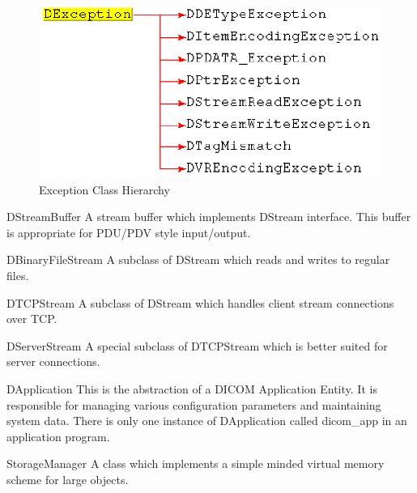 \documentclass[a4paper,10pt]{article}
\begin{document}
\begin{figure}[htbp]
  \begin{center}
    \includegraphics[scale=1.0]{exception-classhierarchy.eps}
    \caption{Exception Class Hierarchy}
    \label{fig:exception}
  \end{center}
\end{figure}


\begin{class}{DStreamBuffer}
  A stream buffer which implements DStream interface. This
  buffer is appropriate for PDU/PDV style input/output.
\end{class}

\begin{class}{DBinaryFileStream}
  A subclass of DStream which reads and writes to regular
  files.
\end{class}

\begin{class}{DTCPStream}
  A subclass of DStream which handles client stream connections
  over TCP.
\end{class}

\begin{class}{DServerStream}
  A special subclass of DTCPStream which is better suited for
  server connections.
\end{class}

\begin{class}{DApplication}
  This is the abstraction of a DICOM Application Entity. It is
  responsible for managing various configuration parameters and maintaining
  system data. There is only one instance of DApplication called dicom{\_}app
  in an application program.
\end{class}

\begin{class}{StorageManager}
  A class which implements a simple minded virtual memory
  scheme for large objects.
\end{class}
\end{document}
